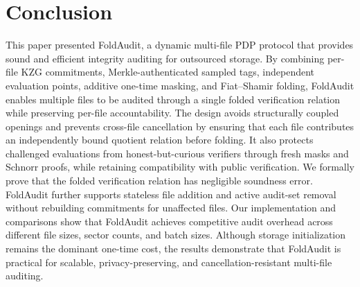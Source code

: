 \documentclass[lettersize,journal]{IEEEtran}
\begin{document}
\section{Conclusion}

This paper presented FoldAudit, a dynamic multi-file PDP protocol that provides sound and efficient integrity auditing for outsourced storage. By combining per-file KZG commitments, Merkle-authenticated sampled tags, independent evaluation points, additive one-time masking, and Fiat--Shamir folding, FoldAudit enables multiple files to be audited through a single folded verification relation while preserving per-file accountability. The design avoids structurally coupled openings and prevents cross-file cancellation by ensuring that each file contributes an independently bound quotient relation before folding. It also protects challenged evaluations from honest-but-curious verifiers through fresh masks and Schnorr proofs, while retaining compatibility with public verification.
We formally prove that the folded verification relation has negligible soundness error. FoldAudit further supports stateless file addition and active audit-set removal without rebuilding commitments for unaffected files. Our implementation and comparisons show that FoldAudit achieves competitive audit overhead across different file sizes, sector counts, and batch sizes. Although storage initialization remains the dominant one-time cost, the results demonstrate that FoldAudit is practical for scalable, privacy-preserving, and cancellation-resistant multi-file auditing.
\end{document}
